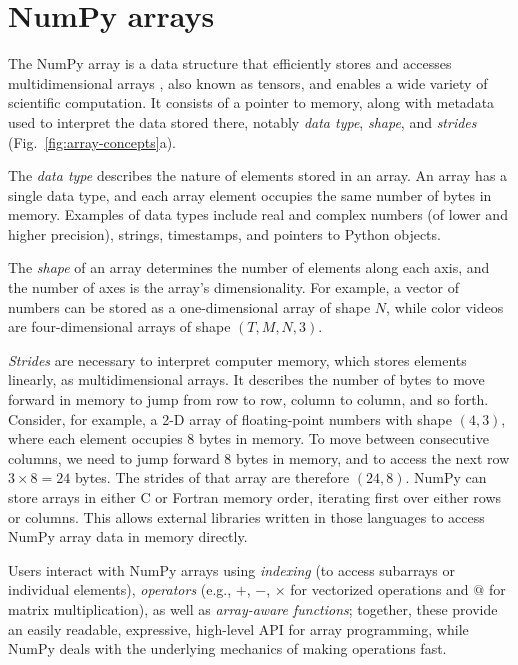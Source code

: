 \section*{NumPy arrays}

The NumPy array is a data structure that efficiently stores and accesses
multidimensional arrays \cite{vanderwalt2011numpy}, also known as tensors, and
enables a wide variety of scientific computation.
It consists of a pointer to memory, along with metadata used to interpret the
data stored there, notably {\em data type}, {\em shape}, and {\em strides}
(Fig.~\ref{fig:array-concepts}a).

The \emph{data type} describes the nature of elements stored in an array.
An array has a single data type, and each array element occupies the same
number of bytes in memory.
Examples of data types include real and complex numbers (of lower and higher
precision), strings, timestamps, and pointers to Python objects.

The \emph{shape} of an array determines the number of elements along each axis,
and the number of axes is the array's dimensionality.
For example, a vector of numbers can be stored as a one-dimensional array of
shape $N$, while color videos are four-dimensional arrays of shape
$(T, M, N, 3)$.

\emph{Strides} are necessary to interpret computer memory, which stores elements
linearly, as multidimensional arrays.
It describes the number of bytes to move forward in memory to jump from row to
row, column to column, and so forth.
Consider, for example, a 2-D array of floating-point numbers with shape
$(4, 3)$, where each element occupies 8 bytes in memory.
To move between consecutive columns, we need to jump forward 8 bytes in memory,
and to access the next row $3 \times 8 = 24$ bytes.
The strides of that array are therefore $(24, 8)$.  NumPy can
store arrays in either C or Fortran memory order, iterating
first over either rows or columns.  This allows external libraries
written in those languages to access NumPy array data in memory directly.

Users interact with NumPy arrays using {\em indexing} (to access
subarrays or individual elements), {\em operators} (e.g., $+$, $-$, $\times$
for vectorized operations and $@$ for matrix multiplication), as well as {\em array-aware functions};
together, these provide an easily readable, expressive, high-level API for
array programming, while NumPy
deals with the underlying mechanics of making operations fast.

